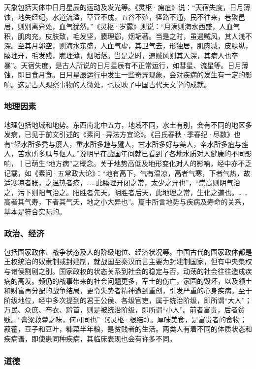 \documentclass[12pt]{ctexbook}
\begin{document}
天象包括天体中日月星辰的运动及发光等。《灵枢·痈疽》说：“天宿失度，日月薄蚀，地失经纪，水道流溢，草萓不成，五谷不殖，径路不通，民不往来，巷聚邑居，则别离异处，血气犹然。”《灵枢·岁露》则说：“月满则海水西盛，人血气积，肌肉充，皮肤致，毛发坚，腠理郄，烟垢著。当是之时，虽遇贼风，其人浅不深。至其月郭空，则海水东盛，人血气虚，其卫气去，形独居，肌肉减，皮肤纵，腠理开，毛发残，膲理薄，烟垢落。当是之时，遇贼风则其入深，其病人也卒暴”。天宿失度，是古人所说的日月星辰有不正常运行，如彗星、流星等。日月薄蚀，即日食月食。日月星辰运行中发生一些奇异现象，会对疾病的发生有一定的影响。这是古人观察事物的入微处，也反映了中国古代天文学的成就。

\subsubsection{地理因素}%

地理包括地域和地势。东西南北中五方，地域不同，水土有别，会有不同的地区多发病，已见于前文引述的《素问·异法方宜论》。《吕氏春秋·季春纪·尽数》也有“轻水所多秃与瘿人，重水所多尰与躄人，甘水所多好与美人，辛水所多疽与痤人，苦水所多尫与伛人。”说明早在战国年间就已看到了各地水质对人健康的不同影响，丨已萌生“地方病”之概念。关于地势高低及地形变化对人的影响，经中亦不乏记载，如《素问·五常政大论》：“地有高下，气有温凉，高者气寒，下者气热，故适寒凉者胀，之温热者疮，……此腠理开闭之常，太少之异也”，“崇高则阴气治之，污下则阳气治之。阳胜者先天，阴胜者后天，此地理之常，生化之道也。……高者其气寿，下者其气夭，地之小大异也”。篇中所言地势与疾病及寿命的关系，基本是符合实际的。

\subsubsection{政治、经济}%

包括国家政体、战争状态及人的阶级地位、经济状况等。中国古代的国家政体都是王权统治的奴隶制或封建制，就战国至秦汉而言主要为封建制国家，但有中央集权与诸侯割剧之别。国家政权的状态关系到社会的稳定与否，动荡的社会往往造成疾病的高发。频仍的战事带来的社会问题更多，军士的伤亡，家园的毁坏，以及领土和财富再分配的战争结局，更令失势者精神遭到重创，引发严重的心身疾病。至于阶级地位，经中多次提到的君王公侯、各级官吏，属于统治阶级，即所谓“大人”；万民、众庶、布衣、黔首，则是被统治阶级，即所谓“小人”。前者富贵，后者贫贱。“膏粱菽藿之味，何可同也”（《灵枢·根结》）。厚味美食，是富贵者的食物；菽藿，豆子和豆叶，糠菜半年粮，是贫贱者的生活。两类人有着不同的体质状态和疾病谱，即使患同种疾病，其临床表现也会有许多不同。

\subsubsection{道德}%
\end{document}
